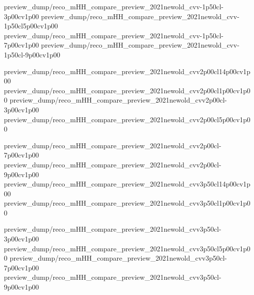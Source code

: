 
{preview_dump/reco_mHH_compare_preview_2021newold_cvv-1p50cl-3p00cv1p00}
{preview_dump/reco_mHH_compare_preview_2021newold_cvv-1p50cl5p00cv1p00}
{preview_dump/reco_mHH_compare_preview_2021newold_cvv-1p50cl-7p00cv1p00}
{preview_dump/reco_mHH_compare_preview_2021newold_cvv-1p50cl-9p00cv1p00}

{preview_dump/reco_mHH_compare_preview_2021newold_cvv2p00cl14p00cv1p00}
{preview_dump/reco_mHH_compare_preview_2021newold_cvv2p00cl1p00cv1p00}
{preview_dump/reco_mHH_compare_preview_2021newold_cvv2p00cl-3p00cv1p00}
{preview_dump/reco_mHH_compare_preview_2021newold_cvv2p00cl5p00cv1p00}

{preview_dump/reco_mHH_compare_preview_2021newold_cvv2p00cl-7p00cv1p00}
{preview_dump/reco_mHH_compare_preview_2021newold_cvv2p00cl-9p00cv1p00}
{preview_dump/reco_mHH_compare_preview_2021newold_cvv3p50cl14p00cv1p00}
{preview_dump/reco_mHH_compare_preview_2021newold_cvv3p50cl1p00cv1p00}

{preview_dump/reco_mHH_compare_preview_2021newold_cvv3p50cl-3p00cv1p00}
{preview_dump/reco_mHH_compare_preview_2021newold_cvv3p50cl5p00cv1p00}
{preview_dump/reco_mHH_compare_preview_2021newold_cvv3p50cl-7p00cv1p00}
{preview_dump/reco_mHH_compare_preview_2021newold_cvv3p50cl-9p00cv1p00}

